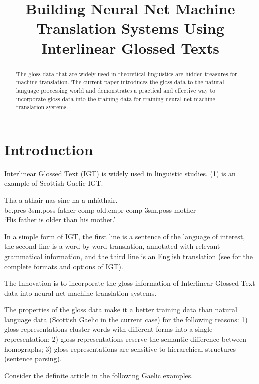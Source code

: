 \documentclass[11pt,a4paper]{article}
\title{Building Neural Net Machine Translation Systems Using Interlinear Glossed Texts}
\date{}
\begin{document}
\maketitle


\begin{abstract}
  The gloss data that are widely used in theoretical linguistics are hidden treasures for machine translation. 
  The current paper introduces the gloss data to the natural language processing world and demonstrates a practical and effective way to incorporate gloss data into the training data for training neural net machine translation systems. 
\end{abstract}

\section{Introduction}
Interlinear Glossed Text (IGT) is widely used in linguistic studies. (1)  is an example of Scottish Gaelic IGT.
\begin{exe}  
\ex \gll    Tha a athair nas sine na a mh\`athair.\\  
            be.pres 3sm.poss father comp old.cmpr comp 3sm.poss mother
\\  
    \glt    `His father is older than his mother.'  
\end{exe}

In a simple form of IGT, the first line is a sentence of the language of interest, the second line is a word-by-word translation, annotated with relevant grammatical information, and the third line is an English translation (see \citet{bickel2008leipzig} for the complete formats and options of IGT).  

The Innovation is to incorporate the gloss information of Interlinear Glossed Text data into neural net machine translation systems.

The properties of the gloss data make it a better training data than natural language data (Scottish Gaelic in the current case) for the following reasons: 1) gloss representations cluster words with different forms into a single representation; 2) gloss representations reserve the semantic difference between homographs; 3) gloss representations are sensitive to hierarchical structures (sentence parsing). 

Consider the definite article in the following Gaelic examples. 
\end{document}
